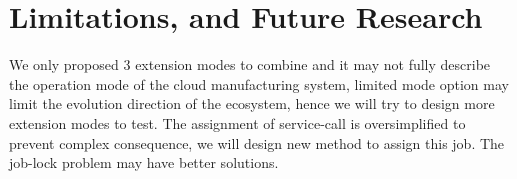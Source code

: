 \section{Limitations, and Future Research} %
\label{sec:contributions_limitations_and_future_research}
We only proposed 3 extension modes to combine and it may not fully describe the operation mode of the cloud manufacturing system, limited mode option may limit the evolution direction of the ecosystem, hence we will try to design more extension modes to test. The assignment of service-call is oversimplified to prevent complex consequence, we will design new method to assign this job. The job-lock problem may have better solutions. 
